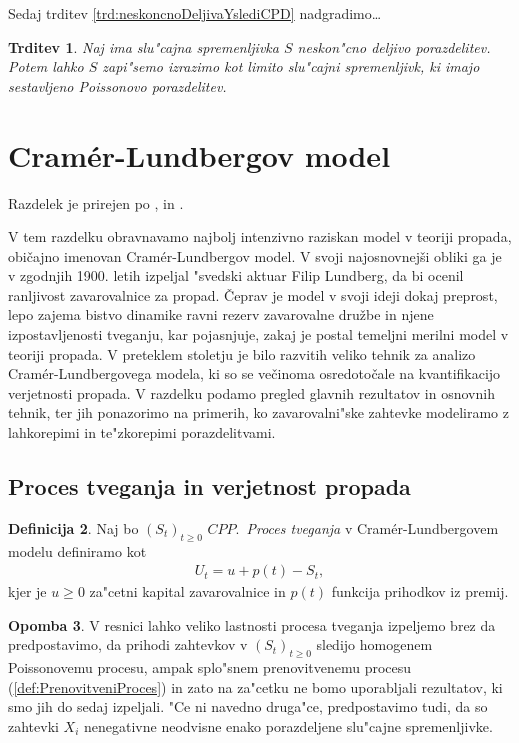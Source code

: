 \documentclass[12pt, a4paper, reqno]{amsart}
\theoremstyle{definition}
\newtheorem{definicija}{Definicija}[section]
\newtheorem{opomba}[definicija]{Opomba}
\theoremstyle{plain}
\newtheorem{trditev}[definicija]{Trditev}
\newcommand{\1}{\mathds{1}}
\begin{document}
    Sedaj trditev \ref{trd:neskoncnoDeljivaYslediCPD} nadgradimo\dots

    \begin{trditev}
        Naj ima slu"cajna spremenljivka $S$ neskon"cno deljivo porazdelitev. Potem lahko $S$ zapi"semo
        izrazimo kot limito slu"cajni spremenljivk, ki imajo sestavljeno Poissonovo porazdelitev.
    \end{trditev}
\pagebreak

\section{Cramér-Lundbergov model}
    Razdelek je prirejen po \cite{3}, \cite{4} in  \cite{5}.

    V tem razdelku obravnavamo najbolj intenzivno raziskan model v teoriji propada, običajno imenovan 
    Cramér-Lundbergov model. V svoji najosnovnejši obliki 
    ga je v zgodnjih 1900. letih izpeljal "svedski aktuar Filip Lundberg, da bi ocenil ranljivost 
    zavarovalnice za propad. Čeprav je model v svoji ideji dokaj preprost, 
    lepo zajema bistvo dinamike ravni rezerv zavarovalne družbe in njene izpostavljenosti tveganju, 
    kar pojasnjuje, zakaj je postal temeljni merilni model v teoriji propada.
    V preteklem stoletju je bilo razvitih veliko tehnik za analizo Cramér-Lundbergovega modela, 
    ki so se večinoma osredotočale na kvantifikacijo verjetnosti propada. V razdelku podamo 
    pregled glavnih rezultatov in osnovnih tehnik, ter jih ponazorimo na primerih, ko 
    zavarovalni"ske zahtevke modeliramo z lahkorepimi in te"zkorepimi porazdelitvami.

    \subsection{Proces tveganja in verjetnost propada}

        \begin{definicija}
            Naj bo $(S_t)_{t\geq0 }$ $CPP$.\ \textit{Proces tveganja} v Cramér-Lundbergovem modelu definiramo kot
            \begin{align*}
                U_t = u + p(t) - S_t,
            \end{align*}
            kjer je $u \geq 0$ za"cetni kapital zavarovalnice in $p(t)$ funkcija prihodkov iz premij. 
            \label{def:procesTveganja}
        \end{definicija}

        \begin{opomba}
            V resnici lahko veliko lastnosti procesa tveganja izpeljemo brez da predpostavimo, da prihodi 
            zahtevkov v $(S_t)_{t\geq0}$ sledijo homogenem Poissonovemu procesu,
            ampak splo"snem prenovitvenemu procesu (\ref{def:PrenovitveniProces}) in
            zato na za"cetku ne bomo uporabljali rezultatov, ki smo jih do sedaj izpeljali. "Ce ni navedno 
            druga"ce, predpostavimo tudi, da so zahtevki $X_i$ nenegativne neodvisne enako porazdeljene
            slu"cajne spremenljivke.
            \label{op:procesTveganja}
        \end{opomba}
\end{document}
